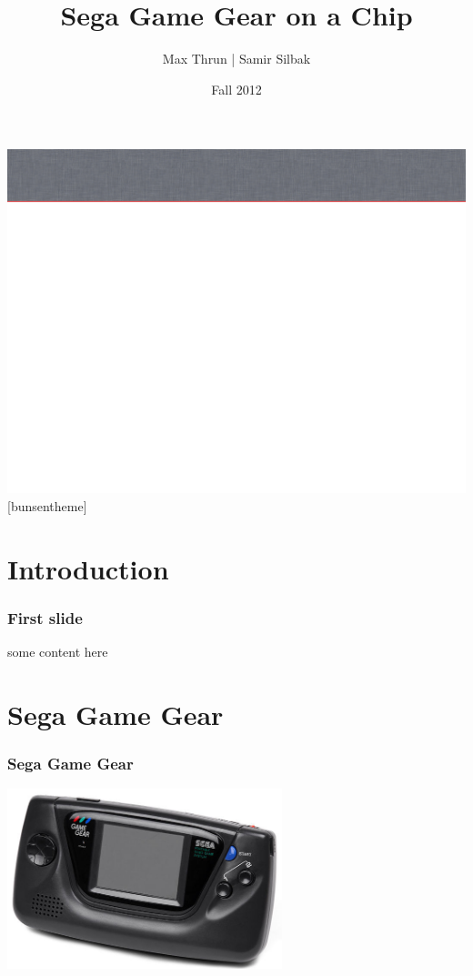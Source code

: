 \documentclass{beamer}
\title{Sega Game Gear on a Chip}
\author{Max Thrun | Samir Silbak}
\institute{University of Cincinnati}
\date{Fall 2012}
\begin{document}
\maketitle

%
%
{\includegraphics[width=\paperwidth,height=\paperheight]{slide_bg}}
[bunsentheme]

\section{Introduction}
\begin{frame}
\frametitle{First slide}
some content here
\end{frame}

\section{Sega Game Gear}
\begin{frame}
    \frametitle{Sega Game Gear}
    \begin{center}
        \includegraphics[width=0.6\textwidth]{gg.jpg}
    \end{center}
\end{frame}
\end{document}
